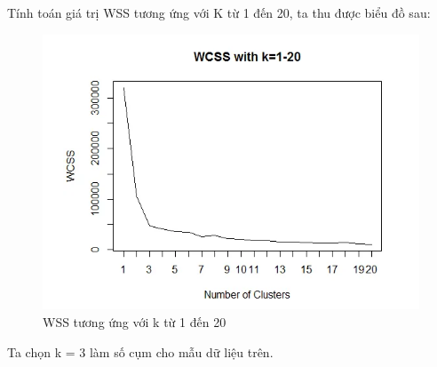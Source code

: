 \documentclass{article}
\begin{document}
	Tính toán giá trị WSS tương ứng với K từ 1 đến 20, ta thu được biểu đồ sau:
	\begin{figure}[h]
		\centering
		\includegraphics[width=0.6\linewidth]{img/data_set_2}
		\caption{WSS tương ứng với k từ 1 đến 20}
	\end{figure}\par
	Ta chọn k = 3 làm số cụm cho mẫu dữ liệu trên.
	\newpage
\end{document}
